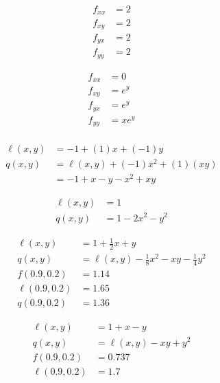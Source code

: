 \documentclass[8pt]{extarticle}
\begin{document}
  \begin{problem}{14.7}
    \begin{description}[font=\normalfont]
      \item[2:]
        \begin{align*}
          f_{xx} &= 2\\
          f_{xy} &= 2\\
          f_{yx} &= 2\\
          f_{yy} &= 2
        \end{align*}
      \item[6:]
        \begin{align*}
          f_{xx} &= 0\\
          f_{xy} &= e^{y}\\
          f_{yx} &= e^{y}\\
          f_{yy} &= xe^{y}\\
        \end{align*}
      \item[12:]
        \begin{align*}
          \ell(x,y) &= -1 + (1)x + (-1)y\\
          q(x,y) &= \ell(x,y) + (-1)x^2 + (1)(xy)\\
                 &= -1 + x - y - x^2 + xy
        \end{align*}
      \item[14:]
        \begin{align*}
          \ell(x,y) &= 1\\
          q(x,y) &= 1 - 2x^2 - y^2
        \end{align*}
      \item[42:]
        \begin{align*}
          \ell(x,y) &= 1 + \frac{1}{2}x + y\\
          q(x,y) &= \ell(x,y) - \frac{1}{8}x^2 - xy - \frac{1}{4}y^2\\
          f(0.9,0.2) &= 1.14\\
          \ell(0.9,0.2) &= 1.65\\
          q(0.9,0.2) &= 1.36
        \end{align*}
      \item[44:]
        \begin{align*}
          \ell(x,y) &= 1 + x - y\\
          q(x,y) &= \ell(x,y) - xy + y^2\\
          f(0.9,0.2) &= 0.737\\
          \ell(0.9,0.2) &= 1.7\\

\end{align*}
\end{description}
\end{problem}
\end{document}
